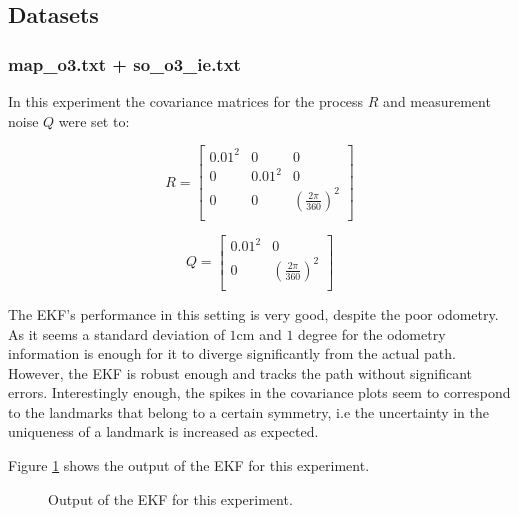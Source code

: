 \subsection{Datasets}

\subsubsection{map\_o3.txt + so\_o3\_ie.txt}

In this experiment the covariance matrices for the process $R$ and measurement noise $Q$ were set to:

\[
R =
\begin{bmatrix}
    0.01^2  & 0			& 0 \\
    0       & 0.01^2 	& 0 \\
    0       & 0 		& (\frac{2\pi}{360})^2 \\

\end{bmatrix}
\]


\[
Q =
\begin{bmatrix}
    0.01^2  & 0 \\
    0       & (\frac{2\pi}{360})^2 \\

\end{bmatrix}
\]

The EKF's performance in this setting is very good, despite the poor odometry. As it seems a standard deviation of $1$cm and $1$ degree for the odometry information
is enough for it to diverge significantly from the actual path. However, the EKF is robust enough and tracks the path without significant errors. Interestingly enough, 
the spikes in the covariance plots seem to correspond to the landmarks that belong to a certain symmetry, i.e the uncertainty in the uniqueness of a landmark is
increased as expected.

Figure \ref{fig:iii3_1} shows the output of the EKF for this experiment.

\begin{figure}[H]
	\scalebox{0.6}{}
	\scalebox{0.6}{}
	
	\centering
	\centerline{}
	\caption{Output of the EKF for this experiment.}
	\label{fig:iii3_1}
\end{figure}

